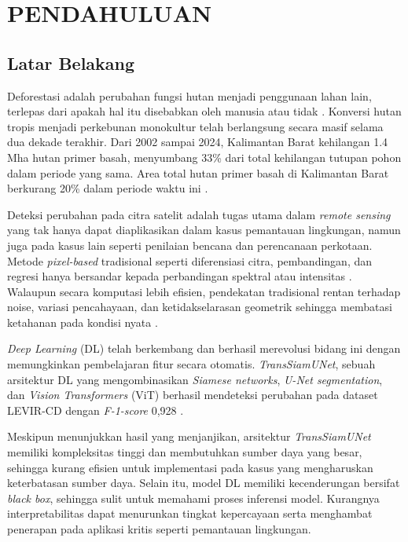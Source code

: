 
\chapter{PENDAHULUAN}

\section{Latar Belakang}

Deforestasi adalah perubahan fungsi hutan menjadi penggunaan lahan lain, terlepas dari apakah hal itu disebabkan oleh manusia atau tidak \citep{FAO2023}. Konversi hutan tropis menjadi perkebunan monokultur telah berlangsung secara masif selama dua dekade terakhir. Dari 2002 sampai 2024, Kalimantan Barat kehilangan 1.4 Mha hutan primer basah, menyumbang 33\% dari total kehilangan tutupan pohon dalam periode yang sama. Area total hutan primer basah di Kalimantan Barat berkurang 20\% dalam periode waktu ini \citep{GFW2026}.

Deteksi perubahan pada citra satelit adalah tugas utama dalam \textit{remote sensing} yang tak hanya dapat diaplikasikan dalam kasus pemantauan lingkungan, namun juga pada kasus lain seperti penilaian bencana dan perencanaan perkotaan. Metode \textit{pixel-based} tradisional seperti diferensiasi citra, pembandingan, dan regresi hanya bersandar kepada perbandingan spektral atau intensitas \citep{richards2022remote}. Walaupun secara komputasi lebih efisien, pendekatan tradisional rentan terhadap noise, variasi pencahayaan, dan ketidakselarasan geometrik sehingga membatasi ketahanan pada kondisi nyata \citep{Ali2026,richards2022remote}.

\textit{Deep Learning} (DL) telah berkembang dan berhasil merevolusi bidang ini dengan memungkinkan pembelajaran fitur secara otomatis. \textit{TransSiamUNet}, sebuah arsitektur DL yang mengombinasikan \textit{Siamese networks}, \textit{U-Net segmentation}, dan \textit{Vision Transformers} (ViT) berhasil mendeteksi perubahan pada dataset LEVIR-CD dengan \textit{F-1-score} 0,928 \citep{Ali2026}. 

Meskipun menunjukkan hasil yang menjanjikan, arsitektur \textit{TransSiamUNet} memiliki kompleksitas tinggi dan membutuhkan sumber daya yang besar, sehingga kurang efisien untuk implementasi pada kasus yang mengharuskan keterbatasan sumber daya. Selain itu, model DL memiliki kecenderungan bersifat \textit{black box}, sehingga sulit untuk memahami proses inferensi model. Kurangnya interpretabilitas dapat menurunkan tingkat kepercayaan serta menghambat penerapan pada aplikasi kritis seperti pemantauan lingkungan.

